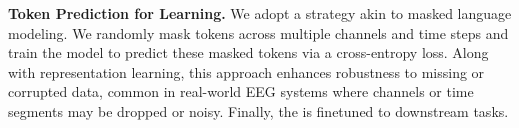 \noindent\textbf{Token Prediction for \encoder Learning. }
We adopt a strategy akin to masked language modeling. 
We randomly mask tokens across multiple channels and time steps and train the model to predict these masked tokens via a cross-entropy loss. Along with representation learning, this approach enhances robustness to missing or corrupted data, common in real-world EEG systems where channels or time segments may be dropped or noisy. Finally, the \encoder is finetuned to downstream tasks.




